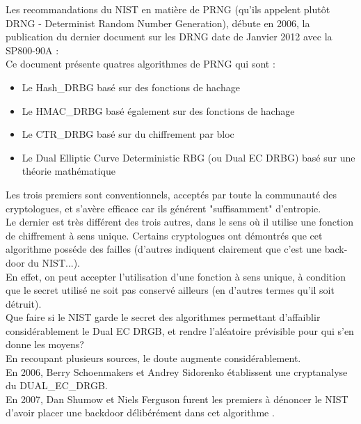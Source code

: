 	Les recommandations du NIST en matière de PRNG (qu'ils appelent plutôt 
	DRNG - Determinist Random Number Generation), débute en 2006, la 
	publication du dernier document sur les DRNG date de Janvier 2012 avec la 
	SP800-90A \cite{nist800-90A}:\\

	Ce document présente quatres algorithmes de PRNG qui sont : 
	\begin{itemize}
		\item Le Hash\_DRBG basé sur des fonctions de hachage
		\item Le HMAC\_DRBG basé également sur des fonctions de hachage
		\item Le CTR\_DRBG basé sur du chiffrement par bloc
		\item Le Dual Elliptic Curve Deterministic RBG (ou Dual EC DRBG) basé 
		sur une théorie mathématique\\
	\end{itemize}

	Les trois premiers sont conventionnels, acceptés par toute la communauté 
	des cryptologues, et s'avère efficace car ils générent "suffisamment" 
	d'entropie.\\
	
	Le dernier est très différent des trois autres, dans le sens où il utilise 
	une fonction de chiffrement à sens unique. Certains cryptologues ont 
	démontrés que cet algorithme posséde des failles (d'autres indiquent 
	clairement que c'est une back-door du NIST...).\\
	
	En effet, on peut accepter l'utilisation d'une fonction à sens unique, à 
	condition que le secret utilisé ne soit pas conservé ailleurs (en d'autres 
	termes qu'il soit détruit).\\

	Que faire si le NIST garde le secret des algorithmes permettant 
	d'affaiblir considérablement le Dual EC DRGB, et rendre l'aléatoire 
	prévisible pour qui s'en donne les moyens?\\

	En recoupant plusieurs sources, le doute augmente considérablement.\\

	En 2006, Berry Schoenmakers et Andrey Sidorenko établissent une 
	cryptanalyse du DUAL\_EC\_DRGB. \cite{dualecrbg2006berry}\\
	
	En 2007, Dan Shumow et Niels Ferguson furent les premiers à dénoncer le 
	NIST d'avoir placer une backdoor délibérément dans cet algorithme
	\cite{shumow2007nist}.\\
	
